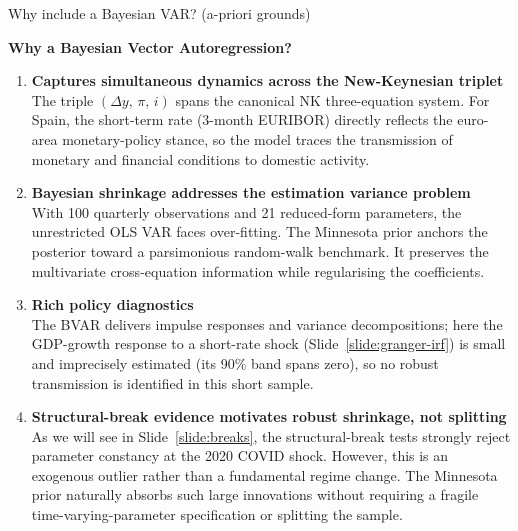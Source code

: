 \documentclass[9pt]{beamer}
\begin{document}
\begin{frame}{Why include a Bayesian VAR? (a-priori grounds)}
\label{slide:bvar}

\textbf{\footnotesize Why a Bayesian Vector Autoregression?}

\scriptsize
\begin{enumerate}
  \item \textbf{Captures simultaneous dynamics across the New-Keynesian triplet}\\
        The triple $(\Delta y,\,\pi,\,i)$ spans the canonical NK three-equation system. For Spain, the short-term rate (3-month EURIBOR) directly reflects the euro-area monetary-policy stance, so the model traces the transmission of monetary and financial conditions to domestic activity.

  \item \textbf{Bayesian shrinkage addresses the estimation variance problem}\\
        With 100 quarterly observations and 21 reduced-form parameters, the unrestricted OLS VAR faces over-fitting. The Minnesota prior anchors the posterior toward a parsimonious random-walk benchmark. It preserves the multivariate cross-equation information while regularising the coefficients.

  \item \textbf{Rich policy diagnostics}\\
        The BVAR delivers impulse responses and variance decompositions; here the GDP-growth response to a short-rate shock (Slide~\ref{slide:granger-irf}) is small and imprecisely estimated (its 90\% band spans zero), so no robust transmission is identified in this short sample.

  \item \textbf{Structural-break evidence motivates robust shrinkage, not splitting}\\
        As we will see in Slide~\ref{slide:breaks}, the structural-break tests strongly reject parameter constancy at the 2020 COVID shock. However, this is an exogenous outlier rather than a fundamental regime change. The Minnesota prior naturally absorbs such large innovations without requiring a fragile time-varying-parameter specification or splitting the sample.
\end{enumerate}

\end{frame}
\end{document}
